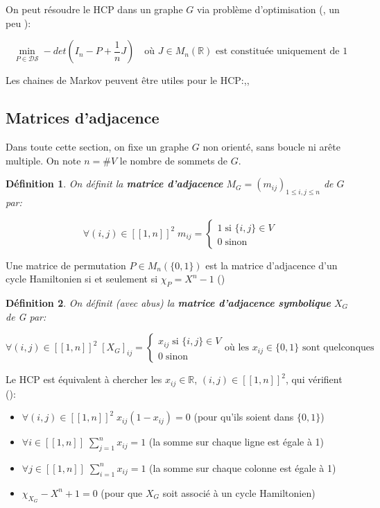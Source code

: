 \documentclass{article}
\newtheorem{definition}{Définition}[section]
\begin{document}
On peut résoudre le HCP dans un graphe $G$  via problème d'optimisation (\cite{Haythorpe2010FindingHC,Ejov2008DeterminantsAL}, un peu \cite{Ejov2009ConsistentBO}):

\[
\min_{P \in \mathcal{D}\mathcal{S}} -det(I_{n}-P+\frac{1}{n}J) \quad \text{où $J \in M_{n}(\mathbb{R})$ est constituée uniquement de 1}
\]

Les chaines de Markov peuvent être utiles pour le HCP:\cite{Haythorpe2013MarkovCB},\cite{Ejov2009ConsistentBO},\cite{Filar2007ControlledMC}


\subsection{Matrices d'adjacence}
Dans toute cette section, on fixe un graphe $G$ non orienté, sans boucle ni arête multiple. On note $n=\# V$ le nombre de sommets de $G$.

\begin{definition}
On définit la \textbf{matrice d'adjacence} $M_G=(m_{ij})_{1 \le i,j \le n}$ de $G$ par:

\[
\forall (i,j) \in [\![1,n]\!]^2 \; m_{ij}=
	\begin{cases}
	1 \; \text{si $\{i,j\} \in V$}\\
	0 \; \text{sinon}
	\end{cases}
\]
\end{definition}

Une matrice de permutation $P \in M_{n}(\{0,1\})$ est la matrice d'adjacence d'un cycle Hamiltonien si et seulement si $\chi _{P} = X^{n}-1$ (\cite{Ejov2006SOLVINGTH})

\begin{definition}
On définit (avec abus) la \textbf{matrice d'adjacence symbolique} $X_{G}$ de G par:

\[
\forall (i,j) \in [\![1,n]\!]^2 \; [X_{G}]_{ij}=
	\begin{cases}
	x_{ij} \; \text{si $\{i,j\} \in V$}\\
	0 \; \text{sinon}
	\end{cases}
\text{où les $x_{ij} \in \{0,1\}$ sont quelconques}
\]
\end{definition}

Le HCP est équivalent à chercher les $x_{ij} \in \mathbb{R}$, $(i,j) \in [\![1,n]\!]^2$, qui vérifient (\cite{Ejov2006SOLVINGTH}):

\begin{itemize}
\item $\forall (i,j) \in [\![1,n]\!]^2 \; x_{ij}(1-x_{ij})=0$ \quad (pour qu'ils soient dans $\{0,1\}$)
\item $\forall i \in [\![1,n]\!] \; \sum\limits_{j=1}^{n}x_{ij}=1$ \quad (la somme sur chaque ligne est égale à 1)
\item $\forall j \in [\![1,n]\!] \; \sum\limits_{i=1}^{n}x_{ij}=1$ \quad (la somme sur chaque colonne est égale à 1)
\item $\chi_{X_{G}} - X^{n}+1=0$ \quad (pour que $X_{G}$ soit associé à un cycle Hamiltonien)
\end{itemize}
\end{document}
